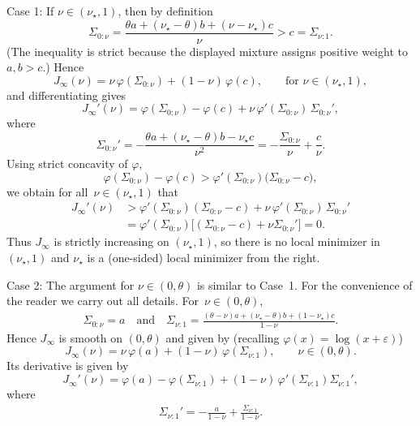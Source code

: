\documentclass[10pt, letterpaper]{amsart}
\begin{document}
Case 1: If $\nu\in(\nu_\star,1)$, then by definition
\[
\Sigma_{0:\nu}
=\frac{\theta a+(\nu_\star-\theta)b+(\nu-\nu_\star)c}{\nu} > c = \Sigma_{\nu:1}.
\]
(The inequality is strict because the displayed mixture assigns positive
weight to $a,b>c$.)
Hence
\begin{equation}\label{eq:J-right}
J_\infty(\nu)=\nu\,\varphi(\Sigma_{0:\nu})+(1-\nu)\,\varphi(c),
\qquad \mbox{for } \nu\in(\nu_\star,1),
\end{equation}
and differentiating gives
\begin{equation}\label{eq:Jprime-right}
J_\infty'(\nu)
=\varphi(\Sigma_{0:\nu})-\varphi(c)+\nu\,\varphi'(\Sigma_{0:\nu})\,\Sigma_{0:\nu}',
\end{equation}
where 
\[
\Sigma_{0:\nu}'= -\frac{\theta a+ (\nu_\star-\theta)b  - \nu_\star c}{\nu^2} = - \frac{\Sigma_{0: \nu}}{ \nu}  + \frac{c}{\nu} .
\]
Using strict concavity of $\varphi$,
\[
\varphi(\Sigma_{0:\nu})-\varphi(c) > \varphi'(\Sigma_{0:\nu})\big(\Sigma_{0:\nu}-c\big),
\]
we obtain for all~$\nu\in(\nu_\star,1)$ that
\begin{align}
J_\infty'(\nu) & > \varphi'(\Sigma_{0:\nu})(\Sigma_{0:\nu}-c)
+\nu\,\varphi'(\Sigma_{0:\nu})\,\Sigma_{0:\nu}'\\
& = \varphi'(\Sigma_{0:\nu})\big[(\Sigma_{0:\nu}-c)+\nu\Sigma_{0:\nu}'\big]=0.
\end{align}
Thus $J_\infty$ is strictly increasing on $(\nu_\star,1)$, so there is no local minimizer
in $(\nu_\star,1)$ and $\nu_\star$ is a (one-sided) local minimizer from the right. \smallskip

Case 2: The argument for $ \nu \in (0,\theta)$ is similar to Case~1. For the convenience of the reader we carry out all details. For~$\nu \in (0, \theta)$,  
\begin{align}
\Sigma_{0:\nu} =  a \quad \mbox{and} \quad \Sigma_{\nu:1}=\frac{(\theta-\nu)a+(\nu_\star-\theta)b+(1-\nu_\star)c}{1-\nu}.    
\end{align}
Hence $J_\infty$ is smooth on $(0,\theta)$ and given by (recalling $\varphi(x)=\log(x+\varepsilon)$)
\[
J_\infty(\nu)=\nu\,\varphi(a)+(1-\nu)\,\varphi(\Sigma_{\nu:1}),
\qquad \nu\in(0,\theta).
\]
Its derivative is given by
\begin{equation}
\label{eq:case2-derivative}
J_\infty'(\nu)=\varphi(a)-\varphi(\Sigma_{\nu:1})+(1-\nu)\,\varphi'(\Sigma_{\nu:1}) \Sigma_{\nu:1}',
\end{equation}
where 
\begin{align}\label{eq:case2-key}
    \Sigma_{\nu:1}' = - \frac{a}{1-\nu} + \frac{\Sigma_{\nu :1}}{1-\nu} .    
\end{align}
\end{document}
